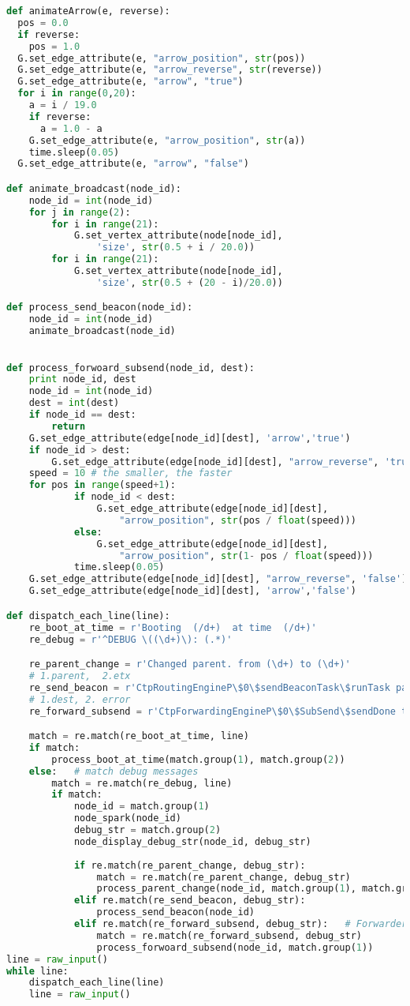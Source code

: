 \begin{lstlisting}[language=Python,tabsize=2]
def animateArrow(e, reverse):
  pos = 0.0
  if reverse:
    pos = 1.0
  G.set_edge_attribute(e, "arrow_position", str(pos))
  G.set_edge_attribute(e, "arrow_reverse", str(reverse))
  G.set_edge_attribute(e, "arrow", "true")
  for i in range(0,20):
    a = i / 19.0
    if reverse:
      a = 1.0 - a
    G.set_edge_attribute(e, "arrow_position", str(a))
    time.sleep(0.05)
  G.set_edge_attribute(e, "arrow", "false")

def animate_broadcast(node_id):
	node_id = int(node_id)
	for j in range(2):
		for i in range(21):
			G.set_vertex_attribute(node[node_id], 
				'size', str(0.5 + i / 20.0))
		for i in range(21):
			G.set_vertex_attribute(node[node_id],
				'size', str(0.5 + (20 - i)/20.0))

def process_send_beacon(node_id):
	node_id = int(node_id)
	animate_broadcast(node_id)
	

def process_forwoard_subsend(node_id, dest):
	print node_id, dest
	node_id = int(node_id)
	dest = int(dest)
	if node_id == dest:
		return
	G.set_edge_attribute(edge[node_id][dest], 'arrow','true')
	if node_id > dest:
		G.set_edge_attribute(edge[node_id][dest], "arrow_reverse", 'true')
	speed = 10 # the smaller, the faster
	for pos in range(speed+1):
			if node_id < dest:
				G.set_edge_attribute(edge[node_id][dest], 
					"arrow_position", str(pos / float(speed)))
			else:
				G.set_edge_attribute(edge[node_id][dest], 
					"arrow_position", str(1- pos / float(speed)))
			time.sleep(0.05)
	G.set_edge_attribute(edge[node_id][dest], "arrow_reverse", 'false')
	G.set_edge_attribute(edge[node_id][dest], 'arrow','false')

def dispatch_each_line(line):
	re_boot_at_time = r'Booting  (/d+)  at time  (/d+)'
	re_debug = r'^DEBUG \((\d+)\): (.*)'

	re_parent_change = r'Changed parent. from (\d+) to (\d+)'
	# 1.parent,  2.etx
	re_send_beacon = r'CtpRoutingEngineP\$0\$sendBeaconTask\$runTask parent: (\d+) etx: (\d+)' 
	# 1.dest, 2. error
	re_forward_subsend = r'CtpForwardingEngineP\$0\$SubSend\$sendDone to (\d+) and (\d+)' 

	match = re.match(re_boot_at_time, line)
	if match:
		process_boot_at_time(match.group(1), match.group(2))
	else:	# match debug messages
		match = re.match(re_debug, line)
		if match:
			node_id = match.group(1)
			node_spark(node_id)
			debug_str = match.group(2)
			node_display_debug_str(node_id, debug_str)
			
			if re.match(re_parent_change, debug_str):
				match = re.match(re_parent_change, debug_str)
				process_parent_change(node_id, match.group(1), match.group(2))
			elif re.match(re_send_beacon, debug_str):
				process_send_beacon(node_id)
			elif re.match(re_forward_subsend, debug_str):	# Forwarder send a packet
				match = re.match(re_forward_subsend, debug_str)
				process_forwoard_subsend(node_id, match.group(1))
line = raw_input()
while line:
	dispatch_each_line(line)
	line = raw_input()
\end{lstlisting}
